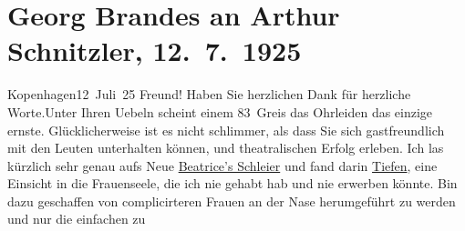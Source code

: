 

         
         \newcommand{\erwaehntePersonen}{Personen:  ?? [Schuldirektor von Georg Brandes]}
         \newcommand{\erwaehnteInstitutionen}{}
         \newcommand{\erwaehnteOrte}{Orte: Kopenhagen, Wien}
         \newcommand{\erwaehnteWerke}{Werke: Der Schleier der Beatrice. Schauspiel in fünf Akten}
               \section[Georg Brandes an Arthur Schnitzler, 12. 7. 1925]{ Georg Brandes an Arthur Schnitzler, 12. 7. 1925}\nopagebreak{}\rehead{ }\begin{ledgroupsized}[t]{13cm}\normalsize\beginnumbering \toendnotes[C]{\smallbreak\pagebreak[2]} 
\toendnotes[C]{\smallbreak}\pstart
           \raggedleft{}{\pb}Kopenhagen12 Juli 25\pend
           \pstart
           Freund! Haben Sie herzlichen Dank für herzliche Worte.\hspace*{2em}Unter Ihren Uebeln scheint einem 83 Greis das Ohrleiden
               das einzige ernste. Glücklicherweise ist es nicht schlimmer, als dass Sie sich
               gastfreundlich mit den Leuten unterhalten können, und theatralischen Erfolg erleben.
               Ich las kürzlich sehr genau aufs Neue \uline{Beatrice’s Schleier} und fand darin \uline{Tiefen}, eine Einsicht in die
               Frauenseele, die ich nie gehabt hab und nie erwerben könnte. Bin dazu geschaffen von
               complicirteren Frauen an der Nase herumgeführt zu werden und nur die einfachen zu

\end{ledgroupsized}
